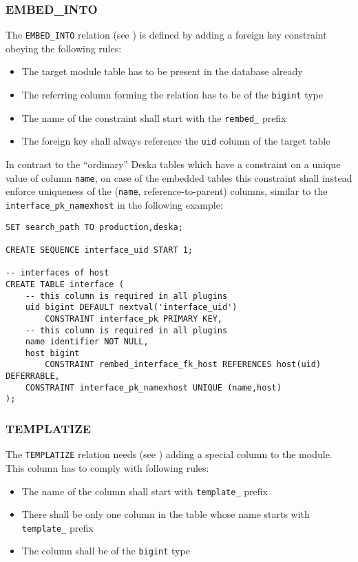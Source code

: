 \documentclass[deska]{subfiles}
\begin{document}
\subsubsection{EMBED\_INTO}

The {\tt EMBED\_INTO} relation (see ) is defined by adding a foreign key constraint
obeying the following rules:

\begin{itemize}
    \item The target module table has to be present in the database already
    \item The referring column forming the relation has to be of the {\tt bigint} type
    \item The name of the constraint shall start with the {\tt rembed\_} prefix
    \item The foreign key shall always reference the {\tt uid} column of the target table
\end{itemize}

In contrast to the ``ordinary'' Deska tables which have a constraint on a unique value of column {\tt name}, on case of
the embedded tables this constraint shall instead enforce uniqueness of the ({\tt name}, reference-to-parent) columns,
similar to the {\tt interface\_pk\_namexhost} in the following example:

\begin{verbatim}
SET search_path TO production,deska;

CREATE SEQUENCE interface_uid START 1;

-- interfaces of host
CREATE TABLE interface (
    -- this column is required in all plugins
    uid bigint DEFAULT nextval('interface_uid')
        CONSTRAINT interface_pk PRIMARY KEY,
    -- this column is required in all plugins
    name identifier NOT NULL,
    host bigint
        CONSTRAINT rembed_interface_fk_host REFERENCES host(uid) DEFERRABLE,
    CONSTRAINT interface_pk_namexhost UNIQUE (name,host)
);
\end{verbatim}


\subsubsection{TEMPLATIZE}

The {\tt TEMPLATIZE} relation needs (see ) adding a special column to the module. This
column has to comply with following rules:

\begin{itemize}
    \item The name of the column shall start with {\tt template\_} prefix
    \item There shall be only one column in the table whose name starts with {\tt template\_} prefix
    \item The column shall be of the {\tt bigint} type
\end{itemize}
\end{document}
